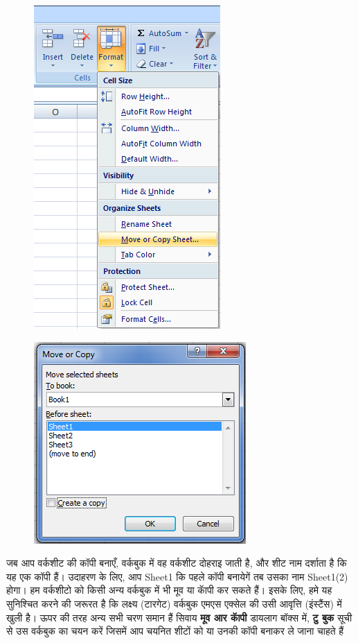 \begin{figure}[H]
\centering
\includegraphics[scale=0.5]{src/images/chapter1/chapter1_fig08.png}
\end{figure}
\begin{figure}[H]
\centering
\includegraphics[scale=0.68]{src/images/chapter1/chapter1_fig09.png}
\end{figure}

जब आप वर्कशीट की कॉपी बनाएँ, वर्कबुक में वह वर्कशीट दोहराइ जाती है, और शीट नाम दर्शाता है कि यह एक कॉपी हैं। उदाहरण के लिए, आप  {\eng Sheet1}  कि पहले कॉपी बनायेगें तब उसका नाम  {\eng Sheet1(2)}  होगा। हम वर्कशीटो को किसी अन्य वर्कबुक में भी मूव या कॅापी कर सकते हैं। इसके लिए, हमे यह सुनिश्चित करने की जरूरत है कि लक्ष्य (टारगेट) वर्कबुक एमएस एक्सेल की उसी आवृत्ति (इंस्टैंस) में खुली है। ऊपर की तरह अन्य सभी चरण समान हैं सिवाय \textbf{मूव आर कॅापी} डायलाग बॉक्स में, \textbf{टु बुक} सूची से उस वर्कबुक का चयन करें जिसमें आप चयनित शीटों को या उनकी कॉपी बनाकर ले जाना चाहते हैं

